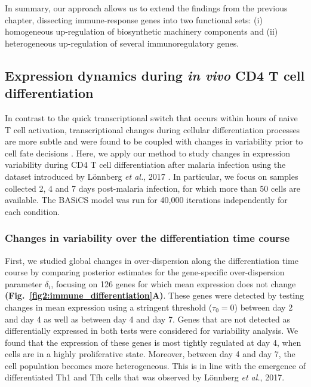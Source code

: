 \newpage

In summary, our approach allows us to extend the findings from the previous chapter, dissecting immune-response genes into two functional sets: (i) homogeneous up-regulation of biosynthetic machinery components and (ii) heterogeneous up-regulation of several immunoregulatory genes.

\subsection{Expression dynamics during \textit{in vivo} CD4\plus{} T cell differentiation}

In contrast to the quick transcriptional switch that occurs within hours of naive T cell activation, transcriptional changes during cellular differentiation processes are more subtle and were found to be coupled with changes in variability prior to cell fate decisions \citep{Richard2016, Mojtahedi2016}. 
Here, we apply our method to study changes in expression variability during CD4\plus{} T cell differentiation after malaria infection using the dataset introduced by L\"onnberg \emph{et al.}, 2017 \cite{Lonnberg2017}. 
In particular, we focus on samples collected 2, 4 and 7 days post-malaria infection, for which more than 50 cells are available. 
The BASiCS model was run for 40,000 iterations independently for each condition.

\subsubsection{Changes in variability over the differentiation time course}

First, we studied global changes in over-dispersion along the differentiation time course by comparing posterior estimates for the gene-specific over-dispersion parameter $\delta_i$, focusing on 126 genes for which mean expression does not change \textbf{(Fig.~\ref{fig2:immune_differentiation}A)}. 
These genes were detected by testing changes in mean expression using a stringent threshold ($\tau_0=0$) between day 2 and day 4 as well as between day 4 and day 7. 
Genes that are not detected as differentially expressed in both tests were considered for variability analysis. 
We found that the expression of these genes is most tightly regulated at day 4, when cells are in a highly proliferative state. 
Moreover, between day 4 and day 7, the cell population becomes more heterogeneous. 
This is in line with the emergence of differentiated Th1 and Tfh cells that was observed by L\"onnberg \emph{et al.}, 2017. \\

